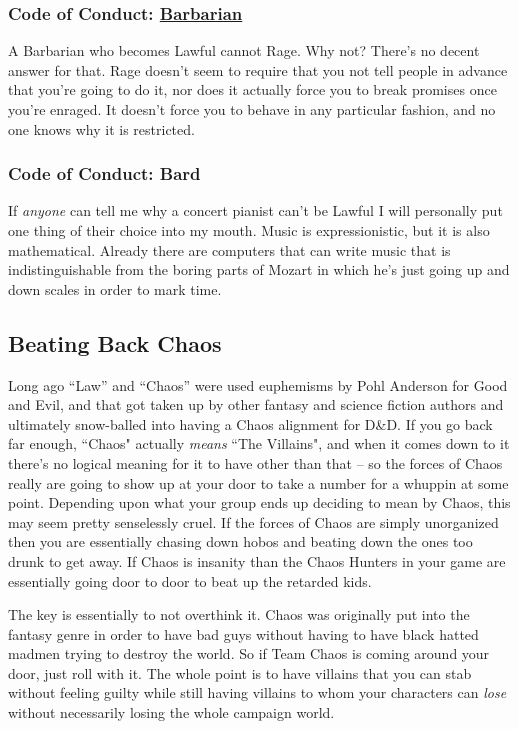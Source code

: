 \subsubsection{Code of Conduct: \hyperref[class:barbarian]{Barbarian}}
A Barbarian who becomes Lawful cannot Rage. Why not? There's no decent answer for that. Rage doesn't seem to require that you not tell people in advance that you're going to do it, nor does it actually force you to break promises once you're enraged. It doesn't force you to behave in any particular fashion, and no one knows why it is restricted.

\subsubsection{Code of Conduct: Bard}
If \textit{anyone} can tell me why a concert pianist can't be Lawful I will personally put one thing of their choice into my mouth. Music is expressionistic, but it is also mathematical. Already there are computers that can write music that is indistinguishable from the boring parts of Mozart in which he's just going up and down scales in order to mark time.

\subsection{Beating Back Chaos}
Long ago ``Law'' and ``Chaos'' were used euphemisms by Pohl Anderson for Good and Evil, and that got taken up by other fantasy and science fiction authors and ultimately snow-balled into having a Chaos alignment for D\&D. If you go back far enough, ``Chaos" actually \textit{means} ``The Villains", and when it comes down to it there's no logical meaning for it to have other than that -- so the forces of Chaos really are going to show up at your door to take a number for a whuppin at some point. Depending upon what your group ends up deciding to mean by Chaos, this may seem pretty senselessly cruel. If the forces of Chaos are simply unorganized then you are essentially chasing down hobos and beating down the ones too drunk to get away. If Chaos is insanity than the Chaos Hunters in your game are essentially going door to door to beat up the retarded kids.

The key is essentially to not overthink it. Chaos was originally put into the fantasy genre in order to have bad guys without having to have black hatted madmen trying to destroy the world. So if Team Chaos is coming around your door, just roll with it. The whole point is to have villains that you can stab without feeling guilty while still having villains to whom your characters can \textit{lose} without necessarily losing the whole campaign world.

